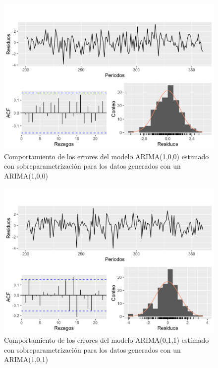 \documentclass[
]{article}
\begin{document}
\begin{figure}[H]
\includegraphics[width=1\linewidth,height=1\textheight]{Tesis_files/figure-latex/errores_simulados_sobreparametrizacion1-1} \caption{Comportamiento de los errores del modelo ARIMA(1,0,0) estimado con sobreparametrización para los datos generados con un ARIMA(1,0,0)}\label{fig:errores_simulados_sobreparametrizacion1}
\end{figure}

\begin{figure}[H]
\includegraphics[width=1\linewidth,height=1\textheight]{Tesis_files/figure-latex/errores_simulados_sobreparametrizacion2-1} \caption{Comportamiento de los errores del modelo ARIMA(0,1,1) estimado con sobreparametrización para los datos generados con un ARIMA(1,0,1)}\label{fig:errores_simulados_sobreparametrizacion2}
\end{figure}
\end{document}
